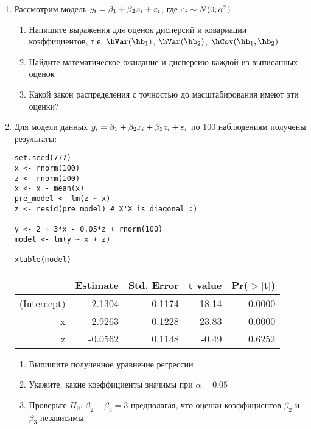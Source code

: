 \documentclass[12pt, a4paper]{article}
\theoremstyle{definition}
\begin{document}
\begin{enumerate}
\item Рассмотрим модель $y_i=\beta_1 + \beta_2 x_i +\varepsilon_i$, где $\varepsilon_i \sim N(0;\sigma^2)$.

\begin{enumerate}
\item Напишите выражения для оценок дисперсий и ковариации коэффициентов, т.е. $\hVar(\hb_1)$, $\hVar(\hb_2)$, $\hCov(\hb_1,\hb_2)$
\item Найдите математическое ожидание и дисперсию каждой из выписанных оценок
\item Какой закон распределения с точностью до масштабирования имеют эти оценки?
\end{enumerate}

\item Для модели данных $y_i=\beta_1 + \beta_2 x_i + \beta_3 z_i + \varepsilon_i$ по 100 наблюдениям получены результаты:

\begin{verbatim}
set.seed(777)
x <- rnorm(100)
z <- rnorm(100)
x <- x - mean(x)
pre_model <- lm(z ~ x)
z <- resid(pre_model) # X'X is diagonal :)

y <- 2 + 3*x - 0.05*z + rnorm(100)
model <- lm(y ~ x + z)

xtable(model)
\end{verbatim}

\begin{table}[ht]
\centering
\begin{tabular}{rrrrr}
  \hline
 & Estimate & Std. Error & t value & Pr($>$$|$t$|$) \\
  \hline
(Intercept) & 2.1304 & 0.1174 & 18.14 & 0.0000 \\
  x & 2.9263 & 0.1228 & 23.83 & 0.0000 \\
  z & -0.0562 & 0.1148 & -0.49 & 0.6252 \\
   \hline
\end{tabular}
\end{table}

\begin{enumerate}
\item Выпишите полученное уравнение регрессии
\item Укажите, какие коэффициенты значимы при $\alpha=0.05$
\item Проверьте $H_0$: $\beta_2-\beta_3=3$ предполагая, что оценки коэффициентов $\beta_2$ и  $\beta_3$ независимы
\end{enumerate}


\end{enumerate}
\end{document}
